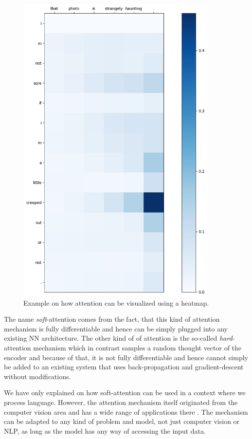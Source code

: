 \begin{figure}[H]
	\centering
	\includegraphics[width=10cm]{img/attention_heatmap_example}
	\caption{Example on how attention can be visualized using a heatmap.}
	\label{fundamentals:seq2seq:attention_weights_visualization}
\end{figure}

The name \emph{soft}-attention comes from the fact, that this kind of attention mechanism is fully differentiable and hence can be simply plugged into any existing NN architecture. The other kind of of attention is the so-called \emph{hard}-attention mechanism which in contrast samples a random thought vector of the encoder and because of that, it is not fully differentiable and hence cannot simply be added to an existing system that uses back-propagation and gradient-descent without modifications.

We have only explained on how soft-attention can be used in a context where we process language. However, the attention mechanism itself originated from the computer vision area \cite{Desimone:1995}\cite{Itti:1998}\cite{Mnih:2014} and has a wide range of applications there \cite{Gregor:2015}\cite{Xu:2015}\cite{Cho:2015}. The mechanism can be adapted to any kind of problem and model, not just computer vision or NLP, as long as the model has any way of accessing the input data.

